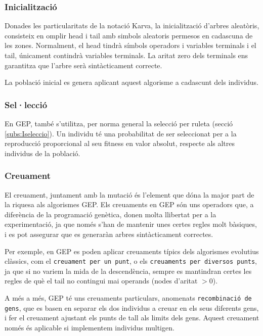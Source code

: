 \subsubsection{Inicialització} %
\label{ssub:Inicialitzacio}
Donades les particularitats de la notació Karva, la inicialització d'arbres
aleatòris, consisteix en omplir head i tail amb simbols aleatoris permesos en
cadascuna de les zones.  Normalment, el head tindrà símbols operadors i
variables terminals i el tail, únicament contindrà variables terminals.  La
aritat zero dels terminals ens garantitza que l'arbre serà sintàcticament
correcte.

La població inicial es genera aplicant aquest algorisme a cadascunt dels
individus.

\subsubsection{Sel·lecció} %
\label{ssub:Seleccio}
En GEP, també s'utilitza, per norma general la selecció per ruleta
(secció \ref{subs:Iseleccio}).  Un individu té una probabilitat de ser seleccionat per a
la reproducció proporcional al seu fitness en valor absolut, respecte als altres
individus de la població.


\subsubsection{Creuament} %
\label{ssub:Creuament}

El creuament, juntament amb la mutació és l'element que dóna la major part de la
riquesa als algorismes GEP.  Els creuaments en GEP són uns operadors que, a
diferència de la programació genètica, donen molta llibertat per a la
experimentació, ja que només s'han de mantenir unes certes regles molt bàsiques,
i es pot assegurar que es generaràn arbres sintàcticament correctes.

Per exemple, en GEP es poden aplicar creuaments típics dels algorismes evolutius
clàssics, com el \texttt{creuament per un punt}, o els \texttt{creuaments per
diversos punts}, ja que si no variem la mida de la descendència, sempre es
mantindran certes les regles de què el tail no contingui mai operands (nodes
d'aritat $>0$).

A més a més, GEP té uns creuaments particulars, anomenats \texttt{recombinació
de gens}, que es basen en separar els dos individus a creuar en els seus
diferents gens, i fer el creuament ajustant els punts de tall als limits dels
gens.  Aquest creuament només és aplicable si implementem individus multigen.

